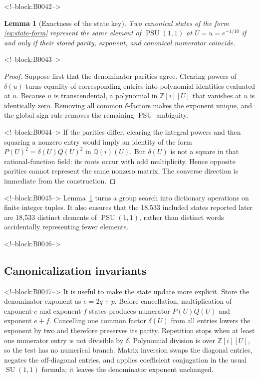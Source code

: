 \documentclass[11pt,a4paper]{article}
\newtheorem{lemma}[theorem]{Lemma}
\theoremstyle{definition}
\newcommand{\Z}{\mathbb Z}
\newcommand{\Q}{\mathbb Q}
\newcommand{\PSU}{\operatorname{PSU}}
\newcommand{\SU}{\operatorname{SU}}
\begin{document}
<!--block:B0042-->
\begin{lemma}[Exactness of the state key]\label{lem:key}
Two canonical states of the form \eqref{eq:state-form} represent the same
element of \(\PSU(1,1)\) at \(U=u=e^{-1/10}\) if and only if their stored
parity, exponent, and canonical numerator coincide.
\end{lemma}

<!--block:B0043-->
\begin{proof}
Suppose first that the denominator parities agree.  Clearing powers of
\(\delta(u)\) turns equality of corresponding entries into polynomial
identities evaluated at \(u\).  Because \(u\) is transcendental, a polynomial
in \(\Z[i][U]\) that vanishes at \(u\) is identically zero.  Removing all
common \(\delta\)-factors makes the exponent unique, and the global sign rule
removes the remaining \(\PSU\) ambiguity.

<!--block:B0044-->
If the parities differ, clearing the integral powers and then squaring a
nonzero entry would imply an identity of the form
\(P(U)^2=\delta(U)Q(U)^2\) in \(\Q(i)(U)\).  But \(\delta(U)\) is not a square
in that rational-function field: its roots occur with odd multiplicity.
Hence opposite parities cannot represent the same nonzero matrix.  The
converse direction is immediate from the construction.
\end{proof}

<!--block:B0045-->
Lemma~\ref{lem:key} turns a group search into dictionary operations on finite
integer tuples.  It also ensures that the 18,533 included states reported
later are 18,533 distinct elements of \(\PSU(1,1)\), rather than distinct
words accidentally representing fewer elements.

<!--block:B0046-->
\subsection{Canonicalization invariants}

<!--block:B0047-->
It is useful to make the state update more explicit.  Store the denominator
exponent as \(e=2q+p\).  Before cancellation, multiplication of exponent-\(e\)
and exponent-\(f\) states produces numerator \(P(U)Q(U)\) and exponent
\(e+f\).  Cancelling one common factor \(\delta(U)\) from all entries lowers
the exponent by two and therefore preserves its parity.  Repetition stops
when at least one numerator entry is not divisible by \(\delta\).  Polynomial
division is over \(\Z[i][U]\), so the test has no numerical branch.  Matrix
inversion swaps the diagonal entries, negates the off-diagonal entries, and
applies coefficient conjugation in the usual \(\SU(1,1)\) formula; it leaves
the denominator exponent unchanged.
\end{document}
